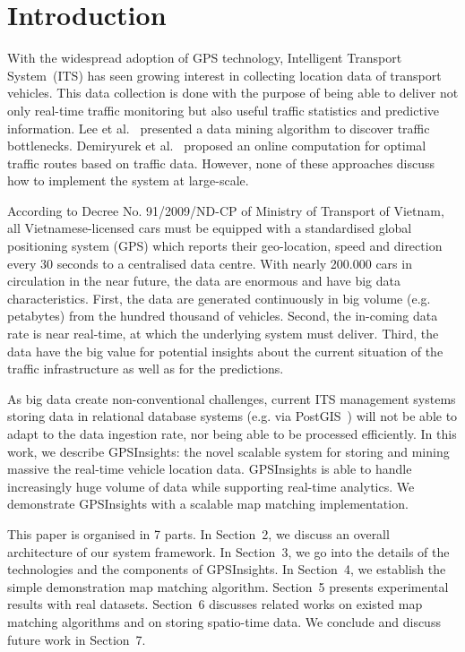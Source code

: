 \documentclass{acm_proc_article-sp}
\begin{document}
\section{Introduction}


With the widespread adoption of GPS technology, Intelligent Transport System~(ITS) has seen growing interest in collecting location data of transport vehicles. This data collection is done with the purpose of being able to deliver not only real-time traffic monitoring but also useful traffic statistics and predictive information. Lee et al.~\cite{Lee2011} presented a data mining algorithm to discover traffic bottlenecks. Demiryurek et al.~\cite{Demiryurek2010} proposed an online computation for optimal traffic routes based on traffic data. However, none of these approaches discuss how to implement the system at large-scale.


According to Decree No. 91/2009/ND-CP of Ministry of Transport of Vietnam, all Vietnamese-licensed cars must be equipped with a standardised global positioning system (GPS) which reports their geo-location, speed and direction every 30 seconds to a centralised data centre. With nearly 200.000 cars in circulation in the near future, the data are enormous and have big data characteristics. First, the data are generated continuously in big volume (e.g. petabytes) from the hundred thousand of vehicles. Second, the in-coming data rate is near real-time, at which the underlying system must deliver. Third, the data have the big value for potential insights about the current situation of the traffic infrastructure as well as for the predictions. 


As big data create non-conventional challenges, current ITS management systems storing data in relational database systems (e.g. via PostGIS~\cite{posgis}) will not be able to adapt to the data ingestion rate, nor being able to be processed efficiently. In this work, we describe GPSInsights: the novel scalable system for storing and mining massive the real-time vehicle location data. GPSInsights is able to handle increasingly huge volume of data while supporting real-time analytics. We demonstrate GPSInsights with a scalable map matching implementation. 

This paper is organised in 7 parts. In Section~2, we discuss an overall architecture of our system framework. In Section~3, we go into the details of the technologies and the components of GPSInsights. In Section~4, we establish the simple demonstration map matching algorithm. Section~5 presents experimental results with real datasets. Section~6 discusses related works on existed map matching algorithms and on storing spatio-time data. We conclude and discuss future work in Section~7.
	
\end{document}
